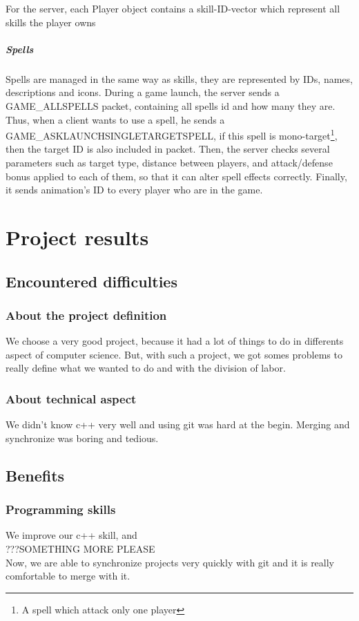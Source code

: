 \documentclass{scrreprt}
\begin{document}
		For the server, each Player object contains a skill-ID-vector which represent all skills the player owns %
		\subsubsection{Spells}
		Spells are managed in the same way as skills, they are represented by IDs, names, descriptions and icons. During a game launch, the server sends a GAME\_ALLSPELLS packet, containing all spells id and how many they are. Thus, when a client wants to use a spell, he sends a GAME\_ASKLAUNCHSINGLETARGETSPELL, if this spell is mono-target\footnote{A spell which attack only one player}, then the target ID is also included in packet. Then, the server checks several parameters such as target type, distance between players, and attack/defense bonus applied to each of them, so that it can alter spell effects correctly. Finally, it sends animation's ID to every player who are in the game.


		\part{Project results}
		\chapter{Encountered difficulties}
		\section{About the project definition}
		We choose a very good project, because it had a lot of things to do in differents aspect of computer science. But, with such a project, we got somes problems to really define what we wanted to do and with the division of labor.
		\section{About technical aspect}
		We didn't know c++ very well and using git was hard at the begin. Merging and synchronize was boring and tedious.
		\chapter{Benefits}
		\section{Programming skills}
		We improve our c++ skill,  and \\ ???SOMETHING MORE PLEASE \\
		Now, we are able to synchronize projects very quickly with git and it is really comfortable to merge with it.
\end{document}
